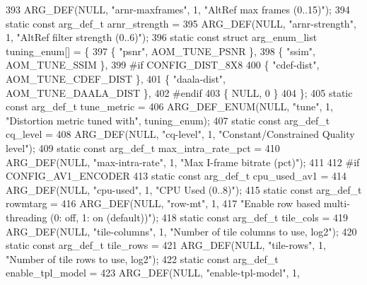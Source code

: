 \begin{DoxyCodeInclude}
{{{{{{{393     ARG\_DEF(NULL, \textcolor{stringliteral}{"arnr-maxframes"}, 1, \textcolor{stringliteral}{"AltRef max frames (0..15)"});
394 \textcolor{keyword}{static} \textcolor{keyword}{const} arg\_def\_t arnr\_strength =
395     ARG\_DEF(NULL, \textcolor{stringliteral}{"arnr-strength"}, 1, \textcolor{stringliteral}{"AltRef filter strength (0..6)"});
396 \textcolor{keyword}{static} \textcolor{keyword}{const} \textcolor{keyword}{struct }arg\_enum\_list tuning\_enum[] = \{
397   \{ \textcolor{stringliteral}{"psnr"}, AOM\_TUNE\_PSNR \},
398   \{ \textcolor{stringliteral}{"ssim"}, AOM\_TUNE\_SSIM \},
399 \textcolor{preprocessor}{#if CONFIG\_DIST\_8X8}
400   \{ \textcolor{stringliteral}{"cdef-dist"}, AOM\_TUNE\_CDEF\_DIST \},
401   \{ \textcolor{stringliteral}{"daala-dist"}, AOM\_TUNE\_DAALA\_DIST \},
402 \textcolor{preprocessor}{#endif}
403   \{ NULL, 0 \}
404 \};
405 \textcolor{keyword}{static} \textcolor{keyword}{const} arg\_def\_t tune\_metric =
406     ARG\_DEF\_ENUM(NULL, \textcolor{stringliteral}{"tune"}, 1, \textcolor{stringliteral}{"Distortion metric tuned with"}, tuning\_enum);
407 \textcolor{keyword}{static} \textcolor{keyword}{const} arg\_def\_t cq\_level =
408     ARG\_DEF(NULL, \textcolor{stringliteral}{"cq-level"}, 1, \textcolor{stringliteral}{"Constant/Constrained Quality level"});
409 \textcolor{keyword}{static} \textcolor{keyword}{const} arg\_def\_t max\_intra\_rate\_pct =
410     ARG\_DEF(NULL, \textcolor{stringliteral}{"max-intra-rate"}, 1, \textcolor{stringliteral}{"Max I-frame bitrate (pct)"});
411 
412 \textcolor{preprocessor}{#if CONFIG\_AV1\_ENCODER}
413 \textcolor{keyword}{static} \textcolor{keyword}{const} arg\_def\_t cpu\_used\_av1 =
414     ARG\_DEF(NULL, \textcolor{stringliteral}{"cpu-used"}, 1, \textcolor{stringliteral}{"CPU Used (0..8)"});
415 \textcolor{keyword}{static} \textcolor{keyword}{const} arg\_def\_t rowmtarg =
416     ARG\_DEF(NULL, \textcolor{stringliteral}{"row-mt"}, 1,
417             \textcolor{stringliteral}{"Enable row based multi-threading (0: off, 1: on (default))"});
418 \textcolor{keyword}{static} \textcolor{keyword}{const} arg\_def\_t tile\_cols =
419     ARG\_DEF(NULL, \textcolor{stringliteral}{"tile-columns"}, 1, \textcolor{stringliteral}{"Number of tile columns to use, log2"});
420 \textcolor{keyword}{static} \textcolor{keyword}{const} arg\_def\_t tile\_rows =
421     ARG\_DEF(NULL, \textcolor{stringliteral}{"tile-rows"}, 1, \textcolor{stringliteral}{"Number of tile rows to use, log2"});
422 \textcolor{keyword}{static} \textcolor{keyword}{const} arg\_def\_t enable\_tpl\_model =
423     ARG\_DEF(NULL, \textcolor{stringliteral}{"enable-tpl-model"}, 1,
}}}}}}}
\end{DoxyCodeInclude}
